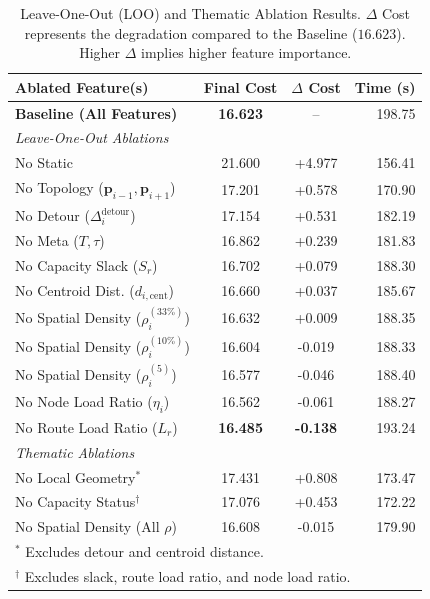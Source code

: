 \documentclass[letterpaper]{article} %
\begin{document}
\begin{table}[t]
\centering
\small
\setlength{\tabcolsep}{4pt}
\caption{Leave-One-Out (LOO) and Thematic Ablation Results. $\Delta$ Cost represents the degradation compared to the Baseline ($16.623$). Higher $\Delta$ implies higher feature importance.}
\label{tab:loo_ablation}
\begin{tabular}{l c c r}
\toprule
\textbf{Ablated Feature(s)} & \textbf{Final Cost} & \textbf{$\Delta$ Cost} & \textbf{Time (s)} \\
\midrule
\textbf{Baseline (All Features)} & \textbf{16.623} & -- & 198.75 \\
\midrule
\textit{Leave-One-Out Ablations} & & & \\
No Static & 21.600 & +4.977 & 156.41 \\
No Topology ($\mathbf{p}_{i-1}, \mathbf{p}_{i+1}$) & 17.201 & +0.578 & 170.90 \\
No Detour ($\Delta^{\text{detour}}_i$) & 17.154 & +0.531 & 182.19 \\
No Meta ($T, \tau$) & 16.862 & +0.239 & 181.83 \\
No Capacity Slack ($S_r$) & 16.702 & +0.079 & 188.30 \\
No Centroid Dist. ($d_{i, \text{cent}}$) & 16.660 & +0.037 & 185.67 \\
No Spatial Density ($\rho^{(33\%)}_i$) & 16.632 & +0.009 & 188.35 \\
No Spatial Density ($\rho^{(10\%)}_i$) & 16.604 & -0.019 & 188.33 \\
No Spatial Density ($\rho^{(5)}_i$) & 16.577 & -0.046 & 188.40 \\
No Node Load Ratio ($\eta_i$) & 16.562 & -0.061 & 188.27 \\
No Route Load Ratio ($L_r$) & \textbf{16.485} & \textbf{-0.138} & 193.24 \\
\midrule
\textit{Thematic Ablations} & & & \\
No Local Geometry$^*$ & 17.431 & +0.808 & 173.47 \\
No Capacity Status$^\dagger$ & 17.076 & +0.453 & 172.22 \\
No Spatial Density (All $\rho$) & 16.608 & -0.015 & 179.90 \\
\bottomrule
\multicolumn{4}{l}{\scriptsize $^*$ Excludes detour and centroid distance.} \\
\multicolumn{4}{l}{\scriptsize $^\dagger$ Excludes slack, route load ratio, and node load ratio.}
\end{tabular}
\end{table}
\end{document}
